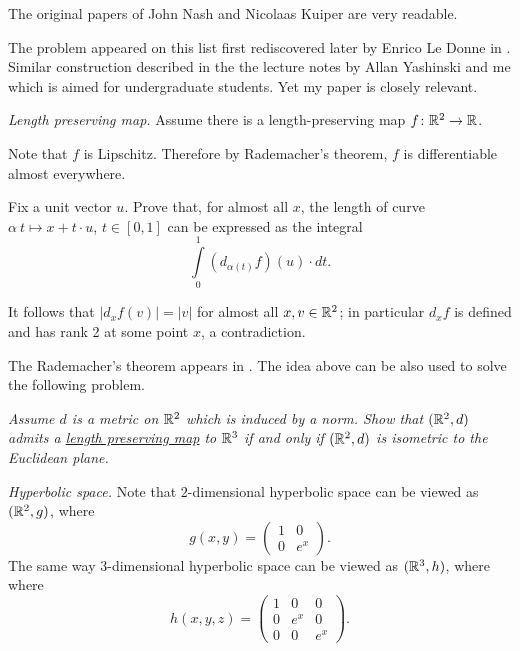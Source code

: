The original papers of John Nash \cite{nash} 
and Nicolaas Kuiper \cite{kuiper} are very readable.

The problem appeared 
on this list first rediscovered later by Enrico Le Donne in \cite{le-donne}.
Similar construction described in the the lecture notes by Allan Yashinski and me \cite{petrunin-yashinsky} 
which is aimed for undergraduate students. 
Yet my paper \cite{petrunin-paths} is closely relevant.

\textit{Length preserving map.}
Assume there is a length-preserving map $f\colon\mathbb{R}^2\to \mathbb{R}$.

Note that $f$ is Lipschitz.
Therefore by Rademacher's theorem, $f$ is differentiable almost everywhere.

Fix a unit vector $u$.
Prove that, for almost all $x$, the length of curve 
$\alpha\:t\mapsto x+t\cdot u$, $t\in[0,1]$ can be expressed as the integral
\[\int\limits_0^1 (d_{\alpha(t)}f)(u) \cdot dt.\]

It follows that $|d_xf(v)|=|v|$ for almost all $x,v\in\mathbb{R}^2$;
in particular $d_xf$ is defined and has rank 2 at some point $x$, a contradiction.  

 The Rademacher's theorem appears in \cite{rademacher}.
The idea above can be also used to solve the following problem.

{\it Assume $d$ is a metric on $\mathbb{R}^2$ 
which is induced by a norm.
Show that $(\mathbb{R}^2,d)$ admits 
a \hyperref[Length preserving map]{\emph{length preserving map}} 
to $\mathbb{R}^3$ 
if and only if 
$(\mathbb{R}^2,d)$ is isometric to the Euclidean plane.}



\textit{Hyperbolic space.}
Note that $2$-dimensional hyperbolic space 
can be viewed as $(\mathbb{R}^2,g)$, where 
\[g(x,y)=\left(\begin{matrix}
     1&0
     \\
     0&e^{x}
    \end{matrix}\right).\]
The same way $3$-dimensional hyperbolic space 
can be viewed as $(\mathbb{R}^3,h)$, where 
where 
\[h(x,y,z)=\left(\begin{matrix}
     1&0&0
     \\
     0&e^{x}&0
     \\
     0&0&e^{x}
    \end{matrix}\right).\]

